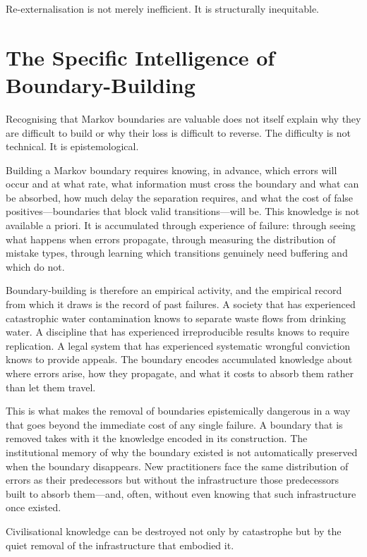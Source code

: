 \documentclass[12pt, a4paper]{article}
\begin{document}
Re-externalisation is not merely inefficient. It is structurally
inequitable.

\section{The Specific Intelligence of Boundary-Building}

Recognising that Markov boundaries are valuable does not itself
explain why they are difficult to build or why their loss is
difficult to reverse. The difficulty is not technical. It is
epistemological.

Building a Markov boundary requires knowing, in advance, which errors
will occur and at what rate, what information must cross the boundary
and what can be absorbed, how much delay the separation requires, and
what the cost of false positives---boundaries that block valid
transitions---will be. This knowledge is not available a priori. It
is accumulated through experience of failure: through seeing what
happens when errors propagate, through measuring the distribution of
mistake types, through learning which transitions genuinely need
buffering and which do not.

Boundary-building is therefore an empirical activity, and the
empirical record from which it draws is the record of past failures.
A society that has experienced catastrophic water contamination knows
to separate waste flows from drinking water. A discipline that has
experienced irreproducible results knows to require replication. A
legal system that has experienced systematic wrongful conviction knows
to provide appeals. The boundary encodes accumulated knowledge about
where errors arise, how they propagate, and what it costs to absorb
them rather than let them travel.

This is what makes the removal of boundaries epistemically dangerous
in a way that goes beyond the immediate cost of any single failure.
A boundary that is removed takes with it the knowledge encoded in its
construction. The institutional memory of why the boundary existed is
not automatically preserved when the boundary disappears. New
practitioners face the same distribution of errors as their
predecessors but without the infrastructure those predecessors built
to absorb them---and, often, without even knowing that such
infrastructure once existed.

Civilisational knowledge can be destroyed not only by catastrophe but
by the quiet removal of the infrastructure that embodied it.
\end{document}
